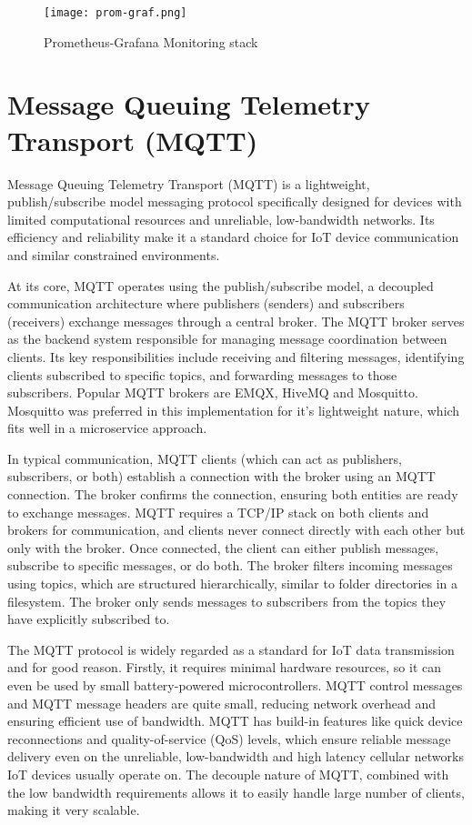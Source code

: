 \begin{figure}[!h]
    \graphicspath{ {./diagrams/} }
    \texttt{[image: prom-graf.png]}
    \centering
    \caption{Prometheus-Grafana Monitoring stack}
    \label{fig:prom_graf}
\end{figure}

\section{Message Queuing Telemetry Transport (MQTT)}
Message Queuing Telemetry Transport (MQTT) is a lightweight, publish/subscribe model messaging protocol specifically designed for devices with limited computational resources and unreliable, low-bandwidth networks. Its efficiency and reliability make it a standard choice for IoT device communication and similar constrained environments.

At its core, MQTT operates using the publish/subscribe model, a decoupled communication architecture where publishers (senders) and subscribers (receivers) exchange messages through a central broker. The MQTT broker serves as the backend system responsible for managing message coordination between clients. Its key responsibilities include receiving and filtering messages, identifying clients subscribed to specific topics, and forwarding messages to those subscribers. Popular MQTT brokers are EMQX, HiveMQ and Mosquitto. Mosquitto was preferred in this implementation for it's lightweight nature, which fits well in a microservice approach.

In typical communication, MQTT clients (which can act as publishers, subscribers, or both) establish a connection with the broker using an MQTT connection. The broker confirms the connection, ensuring both entities are ready to exchange messages. MQTT requires a TCP/IP stack on both clients and brokers for communication, and clients never connect directly with each other but only with the broker. Once connected, the client can either publish messages, subscribe to specific messages, or do both. The broker filters incoming messages using topics, which are structured hierarchically, similar to folder directories in a filesystem. The broker only sends messages to subscribers from the topics they have explicitly subscribed to.

The MQTT protocol is widely regarded as a standard for IoT data transmission and for good reason. Firstly, it requires minimal hardware resources, so it can even be used by small battery-powered microcontrollers. MQTT control messages and MQTT message headers are quite small, reducing network overhead and ensuring efficient use of bandwidth. MQTT has build-in features like quick device reconnections and quality-of-service (QoS) levels, which ensure reliable message delivery even on the unreliable, low-bandwidth and high latency cellular networks IoT devices usually operate on. The decouple nature of MQTT, combined with the low bandwidth requirements allows it to easily handle large number of clients, making it very scalable. 

